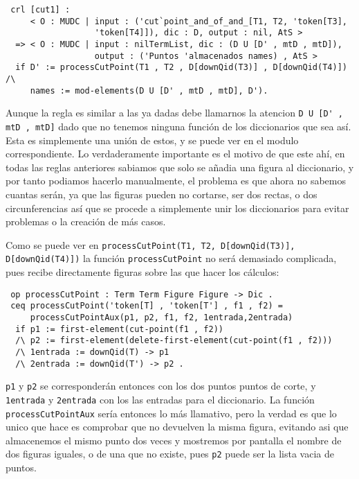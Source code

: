 {\codesize
\begin{verbatim}
 crl [cut1] :
     < O : MUDC | input : ('cut`point_and_of_and_[T1, T2, 'token[T3],
                  'token[T4]]), dic : D, output : nil, AtS >
  => < O : MUDC | input : nilTermList, dic : (D U [D' , mtD , mtD]),
                  output : ('Puntos 'almacenados names) , AtS >
  if D' := processCutPoint(T1 , T2 , D[downQid(T3)] , D[downQid(T4)]) /\
     names := mod-elements(D U [D' , mtD , mtD], D').
\end{verbatim}
}

Aunque la regla es similar a las ya dadas debe llamarnos la atencion \verb"D U [D' , mtD , mtD]" dado que no tenemos ninguna función de los diccionarios que sea así. Esta es simplemente una unión de estos, y se puede ver en el modulo correspondiente. Lo verdaderamente importante es el motivo de que este ahí, en todas las reglas anteriores sabiamos que solo se añadia una figura al diccionario, y por tanto podiamos hacerlo manualmente, el problema es que ahora no sabemos cuantas serán, ya que las figuras pueden no cortarse, ser dos rectas, o dos circunferencias así que se procede a simplemente unir los diccionarios para evitar problemas o la creación de más casos.

Como se puede ver en \verb"processCutPoint(T1, T2, D[downQid(T3)], D[downQid(T4)])" la función \texttt{processCutPoint} no será demasiado complicada, pues recibe directamente figuras sobre las que hacer los cálculos: \par

{\codesize
\begin{verbatim}
 op processCutPoint : Term Term Figure Figure -> Dic .
 ceq processCutPoint('token[T] , 'token[T'] , f1 , f2) =
     processCutPointAux(p1, p2, f1, f2, 1entrada,2entrada)
  if p1 := first-element(cut-point(f1 , f2))
  /\ p2 := first-element(delete-first-element(cut-point(f1 , f2)))
  /\ 1entrada := downQid(T) -> p1
  /\ 2entrada := downQid(T') -> p2 .
\end{verbatim}
}

\texttt{p1} y \texttt{p2} se corresponderán entonces con los dos puntos puntos de corte, y \texttt{1entrada} y \texttt{2entrada} con los las entradas para el diccionario. La función \texttt{processCutPointAux} sería entonces lo más llamativo, pero la verdad es que lo unico que hace es comprobar que no devuelven la misma figura, evitando asi que almacenemos el mismo punto dos veces y mostremos por pantalla el nombre de dos figuras iguales, o de una que no existe, pues \texttt{p2} puede ser la lista vacia de puntos. \par

